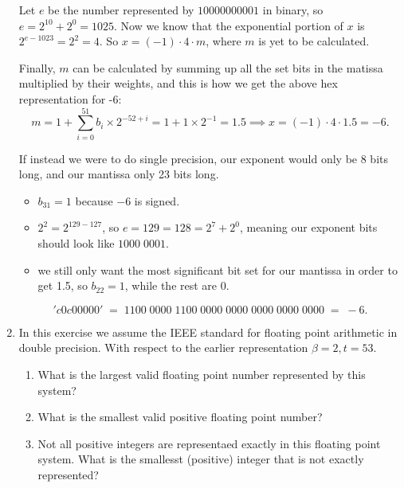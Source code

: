 \documentclass[11pt]{article}
\newcommand{\n}{\vspace{0.3cm}}
\begin{document}
\begin{enumerate}
	      Let \(e\) be the number represented by \(10000000001\) in binary, so \(e = 2^{10} + 2^0 = 1025\).  Now we know that the exponential portion of \(x\) is \(2^{e-1023} = 2^2 = 4\).  So \(x = (-1) \cdot 4 \cdot m\), where \(m\) is yet to be calculated. \n

	      Finally, \(m\) can be calculated by summing up all the set bits in the matissa multiplied by their weights, and this is how we get the above hex representation for -6:
	      \[m = 1 + \sum_{i=0}^{51} b_i \times 2^{-52+i} = 1 + 1 \times 2^{-1} = 1.5 \implies x = (-1) \cdot 4 \cdot 1.5 = -6.\]

	      If instead we were to do single precision, our exponent would only be 8 bits long, and our mantissa only 23 bits long.
	      \begin{itemize}
		      \item \(b_{31} = 1\) because \(-6\) is signed.
		      \item \(2^2 = 2^{129-127}\), so \(e = 129 = 128 = 2^7 + 2^0\), meaning our exponent bits should look like \(1000\;0001\).
		      \item we still only want the most significant bit set for our mantissa in order to get 1.5, so \(b_{22} = 1\), while the rest are 0.
	      \end{itemize}
	      \['c0c00000' \;=\; 1100\;0000\;1100\;0000\;0000\;0000\;0000\;0000 \;=\; -6.\]

	\item In this exercise we assume the IEEE standard for floating point arithmetic in double precision.  With respect to the earlier representation \(\beta = 2, t = 53\).
	      \begin{enumerate}
		      \item What is the largest valid floating point number represented by this system?
		      \item What is the smallest valid positive floating point number?
		      \item Not all positive integers are representaed exactly in this floating point system.  What is the smallesst (positive) integer that is not exactly represented?
	      \end{enumerate}


\end{enumerate}
\end{document}
